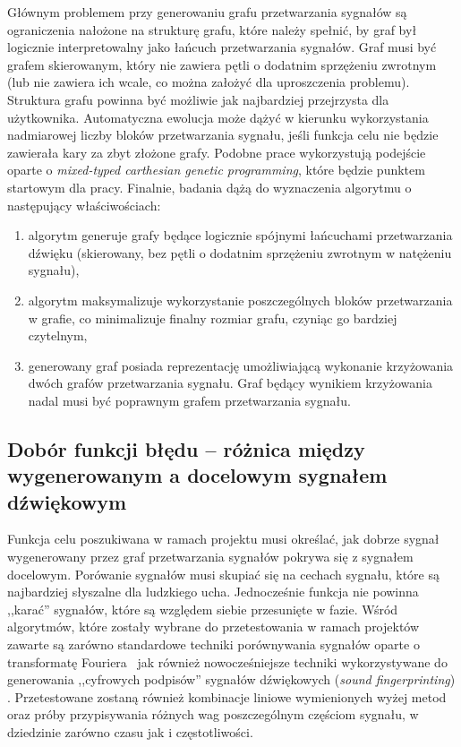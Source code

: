 Głównym problemem przy generowaniu grafu przetwarzania sygnałów są ograniczenia nałożone na strukturę grafu,
które należy spełnić, by graf był logicznie interpretowalny jako łańcuch przetwarzania sygnałów.
Graf musi być grafem skierowanym, który nie zawiera pętli o dodatnim sprzężeniu zwrotnym 
(lub nie zawiera ich wcale, co można założyć dla uproszczenia problemu).
Struktura grafu powinna być możliwie jak najbardziej przejrzysta dla użytkownika. 
Automatyczna ewolucja może dążyć w kierunku wykorzystania nadmiarowej liczby
bloków przetwarzania sygnału, jeśli funkcja celu nie będzie zawierała kary za zbyt złożone grafy.
Podobne prace \cite{evolutionary_puredata} wykorzystują podejście oparte o 
\textit{mixed-typed carthesian genetic programming}, które będzie punktem startowym dla pracy.
Finalnie, badania dążą do wyznaczenia algorytmu o następujący właściwościach:

\begin{enumerate}
    \item algorytm generuje grafy będące logicznie spójnymi łańcuchami przetwarzania dźwięku (skierowany, bez pętli o dodatnim sprzężeniu zwrotnym w natężeniu sygnału),
    \item algorytm maksymalizuje wykorzystanie poszczególnych bloków przetwarzania w grafie, co minimalizuje finalny rozmiar grafu, czyniąc go bardziej czytelnym,
    \item generowany graf posiada reprezentację umożliwiającą wykonanie krzyżowania dwóch grafów przetwarzania sygnału. Graf będący wynikiem krzyżowania nadal musi być poprawnym grafem przetwarzania sygnału.
\end{enumerate}

\subsection{Dobór funkcji błędu -- różnica między wygenerowanym a docelowym sygnałem dźwiękowym}

Funkcja celu poszukiwana w ramach projektu musi określać, jak dobrze sygnał wygenerowany przez
graf przetwarzania sygnałów pokrywa się z sygnałem docelowym. Porówanie sygnałów musi skupiać się
na cechach sygnału, które są najbardziej słyszalne dla ludzkiego ucha. Jednocześnie funkcja nie powinna
,,karać'' sygnałów, które są względem siebie przesunięte w fazie. Wśród algorytmów, które zostały wybrane
do przetestowania w ramach projektów zawarte są zarówno standardowe techniki porównywania sygnałów 
oparte o transformatę Fouriera~\cite{sliding_fourier} jak również nowocześniejsze techniki 
wykorzystywane do generowania ,,cyfrowych podpisów'' sygnałów dźwiękowych (\textit{sound fingerprinting})
\cite{computer_vision_music_identification}. Przetestowane zostaną również kombinacje liniowe
wymienionych wyżej metod oraz próby przypisywania różnych wag poszczególnym częściom sygnału,
w dziedzinie zarówno czasu jak i częstotliwości.

